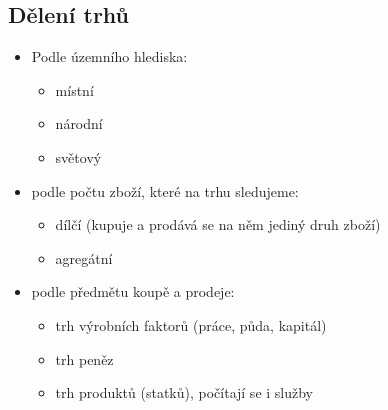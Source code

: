 \subsection{Dělení trhů}
\begin{itemize}
    \item Podle územního hlediska:
    \begin{itemize}
        \item místní
        \item národní
        \item světový
    \end{itemize}
    \item podle počtu zboží, které na trhu sledujeme:
    \begin{itemize}
        \item dílčí (kupuje a prodává se na něm jediný druh zboží)
        \item agregátní
    \end{itemize}
    \item podle předmětu koupě a prodeje:
    \begin{itemize}
        \item trh výrobních faktorů (práce, půda, kapitál)
        \item trh peněz
        \item trh produktů (statků), počítají se i služby
    \end{itemize}
\end{itemize}